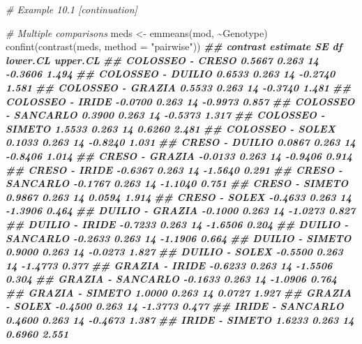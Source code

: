 \documentclass[
  12pt,
]{book}
\newenvironment{Shaded}{\begin{snugshade}}{\end{snugshade}}
\newcommand{\AttributeTok}[1]{\textcolor[rgb]{0.77,0.63,0.00}{#1}}
\newcommand{\CommentTok}[1]{\textcolor[rgb]{0.56,0.35,0.01}{\textit{#1}}}
\newcommand{\DocumentationTok}[1]{\textcolor[rgb]{0.56,0.35,0.01}{\textbf{\textit{#1}}}}
\newcommand{\FunctionTok}[1]{\textcolor[rgb]{0.00,0.00,0.00}{#1}}
\newcommand{\NormalTok}[1]{#1}
\newcommand{\OtherTok}[1]{\textcolor[rgb]{0.56,0.35,0.01}{#1}}
\newcommand{\SpecialCharTok}[1]{\textcolor[rgb]{0.00,0.00,0.00}{#1}}
\newcommand{\StringTok}[1]{\textcolor[rgb]{0.31,0.60,0.02}{#1}}
\begin{document}
\begin{Shaded}
\begin{Highlighting}[]
\CommentTok{\# Example 10.1 [continuation]}

\CommentTok{\# Multiple comparisons}
\NormalTok{meds }\OtherTok{\textless{}{-}} \FunctionTok{emmeans}\NormalTok{(mod, }\SpecialCharTok{\textasciitilde{}}\NormalTok{Genotype)}
\FunctionTok{confint}\NormalTok{(}\FunctionTok{contrast}\NormalTok{(meds, }\AttributeTok{method =} \StringTok{"pairwise"}\NormalTok{))}
\DocumentationTok{\#\#  contrast            estimate    SE df lower.CL upper.CL}
\DocumentationTok{\#\#  COLOSSEO {-} CRESO      0.5667 0.263 14  {-}0.3606    1.494}
\DocumentationTok{\#\#  COLOSSEO {-} DUILIO     0.6533 0.263 14  {-}0.2740    1.581}
\DocumentationTok{\#\#  COLOSSEO {-} GRAZIA     0.5533 0.263 14  {-}0.3740    1.481}
\DocumentationTok{\#\#  COLOSSEO {-} IRIDE     {-}0.0700 0.263 14  {-}0.9973    0.857}
\DocumentationTok{\#\#  COLOSSEO {-} SANCARLO   0.3900 0.263 14  {-}0.5373    1.317}
\DocumentationTok{\#\#  COLOSSEO {-} SIMETO     1.5533 0.263 14   0.6260    2.481}
\DocumentationTok{\#\#  COLOSSEO {-} SOLEX      0.1033 0.263 14  {-}0.8240    1.031}
\DocumentationTok{\#\#  CRESO {-} DUILIO        0.0867 0.263 14  {-}0.8406    1.014}
\DocumentationTok{\#\#  CRESO {-} GRAZIA       {-}0.0133 0.263 14  {-}0.9406    0.914}
\DocumentationTok{\#\#  CRESO {-} IRIDE        {-}0.6367 0.263 14  {-}1.5640    0.291}
\DocumentationTok{\#\#  CRESO {-} SANCARLO     {-}0.1767 0.263 14  {-}1.1040    0.751}
\DocumentationTok{\#\#  CRESO {-} SIMETO        0.9867 0.263 14   0.0594    1.914}
\DocumentationTok{\#\#  CRESO {-} SOLEX        {-}0.4633 0.263 14  {-}1.3906    0.464}
\DocumentationTok{\#\#  DUILIO {-} GRAZIA      {-}0.1000 0.263 14  {-}1.0273    0.827}
\DocumentationTok{\#\#  DUILIO {-} IRIDE       {-}0.7233 0.263 14  {-}1.6506    0.204}
\DocumentationTok{\#\#  DUILIO {-} SANCARLO    {-}0.2633 0.263 14  {-}1.1906    0.664}
\DocumentationTok{\#\#  DUILIO {-} SIMETO       0.9000 0.263 14  {-}0.0273    1.827}
\DocumentationTok{\#\#  DUILIO {-} SOLEX       {-}0.5500 0.263 14  {-}1.4773    0.377}
\DocumentationTok{\#\#  GRAZIA {-} IRIDE       {-}0.6233 0.263 14  {-}1.5506    0.304}
\DocumentationTok{\#\#  GRAZIA {-} SANCARLO    {-}0.1633 0.263 14  {-}1.0906    0.764}
\DocumentationTok{\#\#  GRAZIA {-} SIMETO       1.0000 0.263 14   0.0727    1.927}
\DocumentationTok{\#\#  GRAZIA {-} SOLEX       {-}0.4500 0.263 14  {-}1.3773    0.477}
\DocumentationTok{\#\#  IRIDE {-} SANCARLO      0.4600 0.263 14  {-}0.4673    1.387}
\DocumentationTok{\#\#  IRIDE {-} SIMETO        1.6233 0.263 14   0.6960    2.551}

\end{Highlighting}
\end{Shaded}
\end{document}

